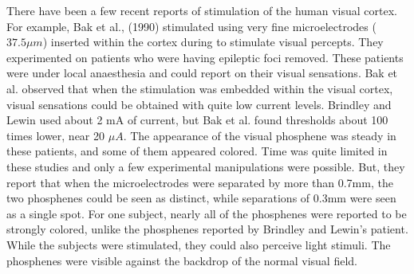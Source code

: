 There have been a few recent reports of stimulation of the human
visual cortex.  For example, Bak et al., (1990) stimulated using very
fine microelectrodes ($37.5 \mu m$) inserted within the cortex during
to stimulate visual percepts.  They experimented on patients who were
having epileptic foci removed.  These patients were under local
anaesthesia and could report on their visual sensations.  Bak et
al. observed that when the stimulation was embedded within the visual cortex,
visual sensations could be
obtained with quite low current levels.
Brindley and Lewin used about 2 mA of current, but Bak et al. found
thresholds about 100 times lower, near 20 $\mu A$.  The appearance of
the visual phosphene was steady in these patients, and some of them
appeared colored.  Time was quite limited in these studies and only a
few experimental manipulations were possible.  But, they report that
when the microelectrodes were separated by more than 0.7mm, the two
phosphenes could be seen as distinct, while separations of 0.3mm were
seen as a single spot.  For one subject, nearly all of the phosphenes
were reported to be strongly colored, unlike the phosphenes reported
by Brindley and Lewin's patient.  While the subjects were stimulated,
they could also perceive light stimuli.  The phosphenes were visible
against the backdrop of the normal visual field.

